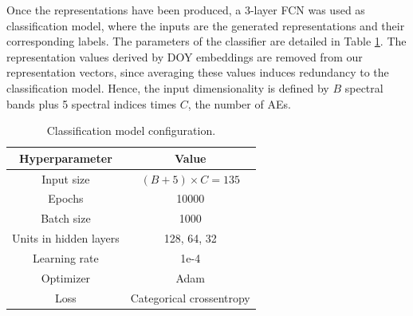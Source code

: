 \documentclass[journal,article,submit,pdftex,moreauthors]{Definitions/mdpi}
\begin{document}

Once the representations have been produced, a 3-layer FCN was used as classification model, where the inputs are the generated representations and their corresponding labels. The parameters of the classifier are detailed in Table \ref{fcn_hyperparameters}.
The representation values derived by DOY embeddings are removed from our representation vectors, since averaging these values induces redundancy to the classification model. Hence, the input dimensionality is defined by $B$ spectral bands plus 5 spectral indices times $C$, the number of AEs.
\begin{table}[H]
	\centering
	\caption{Classification model configuration.}
	\begin{tabular}{c|c}
	\hline
		Hyperparameter & Value \\ \hline
		Input size & $(B + 5) \times C = 135$ \\
		Epochs & 10000 \\ 
		Batch size & 1000\\ 
		Units in hidden layers & 128, 64, 32 \\  
		Learning rate & 1e-4 \\
		Optimizer & Adam \\ 
		Loss & Categorical crossentropy \\ \hline
	\end{tabular}
	\label{fcn_hyperparameters}
\end{table}
\end{document}
